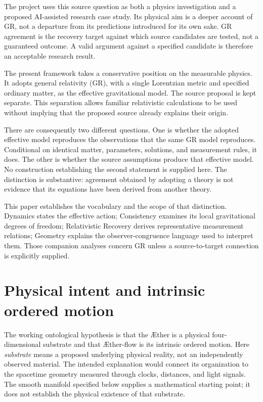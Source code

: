 \documentclass[11pt,oneside]{report}
\newcommand{\Aether}{\AE{}ther}
\newcommand{\Aflow}{\AE{}ther-flow}
\theoremstyle{remark}
\numberwithin{definition}{chapter}
\numberwithin{proposition}{chapter}
\numberwithin{remark}{chapter}
\begin{document}
The project uses this source question as both a physics investigation and a proposed AI-assisted research case study. Its physical aim is a deeper account of GR, not a departure from its predictions introduced for its own sake. GR agreement is the recovery target against which source candidates are tested, not a guaranteed outcome. A valid argument against a specified candidate is therefore an acceptable research result.

The present framework takes a conservative position on the measurable physics. It adopts general relativity (GR), with a single Lorentzian metric and specified ordinary matter, as the effective gravitational model. The source proposal is kept separate. This separation allows familiar relativistic calculations to be used without implying that the proposed source already explains their origin.

There are consequently two different questions. One is whether the adopted effective model reproduces the observations that the same GR model reproduces. Conditional on identical matter, parameters, solutions, and measurement rules, it does. The other is whether the source assumptions produce that effective model. No construction establishing the second statement is supplied here. The distinction is substantive: agreement obtained by adopting a theory is not evidence that its equations have been derived from another theory.

This paper establishes the vocabulary and the scope of that distinction. Dynamics states the effective action; Consistency examines its local gravitational degrees of freedom; Relativistic Recovery derives representative measurement relations; Geometry explains the observer-congruence language used to interpret them. Those companion analyses concern GR unless a source-to-target connection is explicitly supplied.

\section{Physical intent and intrinsic ordered motion}
The working ontological hypothesis is that the \Aether{} is a physical four-dimensional substrate and that \Aflow{} is its intrinsic ordered motion. Here \emph{substrate} means a proposed underlying physical reality, not an independently observed material. The intended explanation would connect its organization to the spacetime geometry measured through clocks, distances, and light signals. The smooth manifold specified below supplies a mathematical starting point; it does not establish the physical existence of that substrate.
\end{document}
